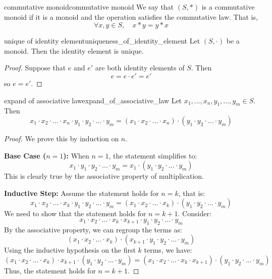 \begin{definition}{commutative monoid}{commutative monoid}
  We say that $(S, \ast)$ is a commutative monoid if it is a monoid and the operation satisfies the commutative law. That is,
  \[
    \forall x, y \in S, \quad x \ast y = y \ast x
  \]
\end{definition}

\begin{proposition}{unique of identity element}{uniqueness_of_identity_element}
  Let $(S, \cdot)$ be a monoid. Then the identity element is unique.
\end{proposition}
\begin{proof}
  Suppose that $e$ and $e'$ are both identity elements of $S$. Then
  \[
    e = e \cdot e' = e'
  \]
  so $e = e'$.
\end{proof}

\begin{proposition}{expand of associative law}{expand_of_associative_law}
  Let $x_1, \ldots, x_n, y_1, \ldots, y_m \in S$. Then
  \[
    x_1 \cdot x_2 \cdot \ldots \cdot x_n \cdot y_1 \cdot y_2 \cdot \ldots \cdot y_m = (x_1 \cdot x_2 \cdot \ldots \cdot x_n) \cdot (y_1 \cdot y_2 \cdot \ldots \cdot y_m)
  \]
\end{proposition}
\begin{proof}
  We prove this by induction on $n$.

  \textbf{Base Case ($n = 1$):}
  When $n = 1$, the statement simplifies to:
  \[
    x_1 \cdot y_1 \cdot y_2 \cdot \ldots \cdot y_m = x_1 \cdot (y_1 \cdot y_2 \cdot \ldots \cdot y_m)
  \]
  This is clearly true by the associative property of multiplication.

  \textbf{Inductive Step:}
  Assume the statement holds for $n = k$, that is:
  \[
    x_1 \cdot x_2 \cdot \ldots \cdot x_k \cdot y_1 \cdot y_2 \cdot \ldots \cdot y_m = (x_1 \cdot x_2 \cdot \ldots \cdot x_k) \cdot (y_1 \cdot y_2 \cdot \ldots \cdot y_m)
  \]
  We need to show that the statement holds for $n = k + 1$. Consider:
  \[
    x_1 \cdot x_2 \cdot \ldots \cdot x_k \cdot x_{k+1} \cdot y_1 \cdot y_2 \cdot \ldots \cdot y_m
  \]
  By the associative property, we can regroup the terms as:
  \[
    (x_1 \cdot x_2 \cdot \ldots \cdot x_k ) \cdot (x_{k+1} \cdot y_1 \cdot y_2 \cdot \ldots \cdot y_m)
  \]
  Using the inductive hypothesis on the first $k$ terms, we have:
  \[
    (x_1 \cdot x_2 \cdot \ldots \cdot x_k) \cdot x_{k+1} \cdot (y_1 \cdot y_2 \cdot \ldots \cdot y_m) = (x_1 \cdot x_2 \cdot \ldots \cdot x_k \cdot x_{k+1}) \cdot (y_1 \cdot y_2 \cdot \ldots \cdot y_m)
  \]
  Thus, the statement holds for $n = k + 1$.

\end{proof}

